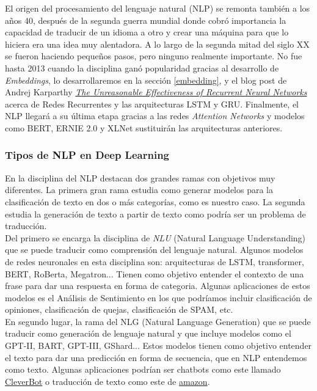 \documentclass[10pt,riqno,a4paper,twoside]{article}\usepackage[]{graphicx}\usepackage[]{color}
\begin{document}
El origen del procesamiento del lenguaje natural (NLP) se remonta también a los años 40, despu\'{e}s de la segunda guerra mundial donde cobr\'{o} importancia la capacidad de traducir de un idioma a otro y crear una m\'{a}quina para que lo hiciera era una idea muy alentadora. A lo largo de la segunda mitad del siglo XX se fueron haciendo pequeños pasos, pero ninguno realmente importante. No fue hasta 2013 cuando la disciplina ganó popularidad gracias al desarrollo de \textit{Embeddings}, lo desarrollaremos en la sección \ref{embedding}, y el blog post de Andrej Karparthy \href{http://karpathy.github.io/2015/05/21/rnn-effectiveness/}{\textit{The Unreasonable Effectiveness of Recurrent Neural Networks}} \cite{LSTM_cite} acerca de Redes Recurrentes y las arquitecturas LSTM y GRU. Finalmente, el NLP llegará a su última etapa gracias a las redes \textit{Attention Networks} y modelos como BERT, ERNIE 2.0 y XLNet sustituirán las arquitecturas anteriores. 

\subsubsection{Tipos de NLP en Deep Learning}

En la disciplina del NLP destacan dos grandes ramas con objetivos muy diferentes. La primera gran rama estudia como generar modelos para la clasificación de texto en dos o más categorías, como es nuestro caso. La segunda estudia la generación de texto a partir de texto como podría ser un problema de traducción.\\

Del primero se encarga la disciplina de \textit{NLU} (Natural Language Understanding) que se puede traducir como 
comprensión del lenguaje natural. Algunos modelos de redes neuronales en esta disciplina son: arquitecturas de LSTM, transformer, BERT, RoBerta, Megatron... Tienen como objetivo entender el contexto de una frase para dar una respuesta en forma de categoria. Algunas aplicaciones de estos modelos es el Análisis de Sentimiento en los que podríamos incluir clasificación de opiniones, clasificación de quejas, clasificación de SPAM, etc.\\

En segundo lugar, la rama del NLG (Natural Language Generation) que se puede traducir como generación de lenguaje natural y que incluye modelos como el GPT-II, BART, GPT-III, GShard... Estos modelos tienen como objetivo entender el texto para dar una predicción en forma de secuencia, que en NLP entendemos como texto. Algunas aplicaciones podrían ser chatbots como este llamado \href{https://www.cleverbot.com/}{CleverBot} o traducción de texto como este de \href{https://aws.amazon.com/es/translate/}{amazon}.\\
\end{document}
